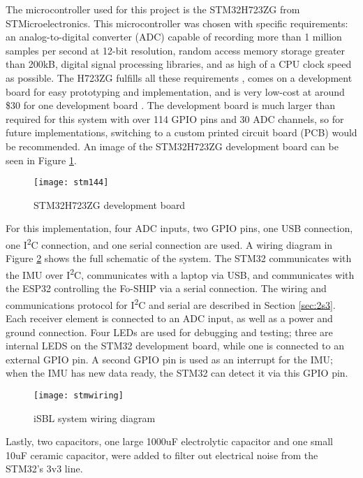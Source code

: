 \documentclass[12pt,a4paper]{report}
\begin{document}
The microcontroller used for this project is the STM32H723ZG from STMicroelectronics. This microcontroller was chosen with specific requirements: an analog-to-digital converter (ADC) capable of recording more than 1 million samples per second at 12-bit resolution, random access memory storage greater than 200kB, digital signal processing libraries, and as high of a CPU clock speed as possible. The H723ZG fulfills all these requirements \cite{stmdatasheet}, comes on a development board for easy prototyping and implementation, and is very low-cost at around \$30 for one development board \cite{stm144}. The development board is much larger than required for this system with over 114 GPIO pins and 30 ADC channels, so for future implementations, switching to a custom printed circuit board (PCB) would be recommended. An image of the STM32H723ZG development board can be seen in Figure \ref{fig:stm144}.

\begin{figure}[htbp]
	\centering
	\texttt{[image: stm144]}
	\caption{STM32H723ZG development board \cite{stm144}}
	\label{fig:stm144}
\end{figure}

For this implementation, four ADC inputs, two GPIO pins, one USB connection, one I\textsuperscript{2}C connection, and one serial connection are used. A wiring diagram in Figure \ref{fig:stmwiring} shows the full schematic of the system. The STM32 communicates with the IMU over I\textsuperscript{2}C, communicates with a laptop via USB, and communicates with the ESP32 controlling the Fo-SHIP via a serial connection. The wiring and communications protocol for I\textsuperscript{2}C and serial are described in Section \ref{sec:2s3}. Each receiver element is connected to an ADC input, as well as a power and ground connection. Four LEDs are used for debugging and testing; three are internal LEDS on the STM32 development board, while one is connected to an external GPIO pin. A second GPIO pin is used as an interrupt for the IMU; when the IMU has new data ready, the STM32 can detect it via this GPIO pin.

\begin{figure}[htbp]
	\centering
	\texttt{[image: stmwiring]}
	\caption{iSBL system wiring diagram}
	\label{fig:stmwiring}
\end{figure}

Lastly, two capacitors, one large 1000uF electrolytic capacitor and one small 10uF ceramic capacitor, were added to filter out electrical noise from the STM32’s 3v3 line. 
\end{document}
